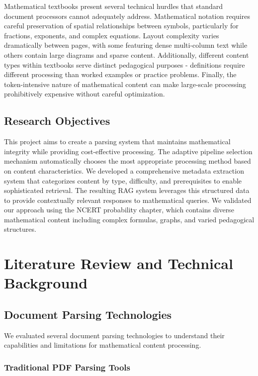 \documentclass[12pt]{article}
\begin{document}
Mathematical textbooks present several technical hurdles that standard document processors cannot adequately address. Mathematical notation requires careful preservation of spatial relationships between symbols, particularly for fractions, exponents, and complex equations. Layout complexity varies dramatically between pages, with some featuring dense multi-column text while others contain large diagrams and sparse content. Additionally, different content types within textbooks serve distinct pedagogical purposes - definitions require different processing than worked examples or practice problems. Finally, the token-intensive nature of mathematical content can make large-scale processing prohibitively expensive without careful optimization.

\subsection{Research Objectives}

This project aims to create a parsing system that maintains mathematical integrity while providing cost-effective processing. The adaptive pipeline selection mechanism automatically chooses the most appropriate processing method based on content characteristics. We developed a comprehensive metadata extraction system that categorizes content by type, difficulty, and prerequisites to enable sophisticated retrieval. The resulting RAG system leverages this structured data to provide contextually relevant responses to mathematical queries. We validated our approach using the NCERT probability chapter, which contains diverse mathematical content including complex formulas, graphs, and varied pedagogical structures.

\section{Literature Review and Technical Background}

\subsection{Document Parsing Technologies}

We evaluated several document parsing technologies to understand their capabilities and limitations for mathematical content processing.

\subsubsection{Traditional PDF Parsing Tools}
\end{document}
